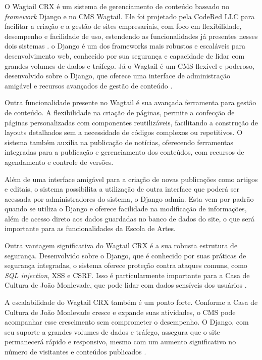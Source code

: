 O Wagtail CRX é um sistema de gerenciamento de conteúdo baseado no \textit{framework} Django e no \ac{CMS} Wagtail. Ele foi projetado pela CodeRed LLC para facilitar a criação e a gestão de sites empresariais, com foco em flexibilidade, desempenho e facilidade de uso, estendendo as funcionalidades já presentes nesses dois sistemas \cite{WagtailCRX}. o Django é um dos frameworks mais robustos e escaláveis para desenvolvimento web, conhecido por sua segurança e capacidade de lidar com grandes volumes de dados e tráfego. Já o Wagtail é um \ac{CMS} flexível e poderoso, desenvolvido sobre o Django, que oferece uma interface de administração amigável e recursos avançados de gestão de conteúdo \cite{Wagtail}.

Outra funcionalidade presente no Wagtail é sua avançada ferramenta para gestão de conteúdo. A flexibilidade na criação de páginas, permite a confecção de páginas personalizadas com componentes reutilizáveis, facilitando a construção de layouts detalhados sem a necessidade de códigos complexos ou repetitivos. O sistema também auxilia na publicação de notícias, oferecendo ferramentas integradas para a publicação e gerenciamento dos conteúdos, com recursos de agendamento e controle de versões.

Além de uma interface amigável para a criação de novas publicações como artigos e editais, o sistema possibilita a utilização de outra interface que poderá ser acessada por administradores do sistema, o Django admin. Esta vem por padrão quando se utiliza o Django e oferece facilidade na modificação de informações, além de acesso direto aos dados guardadas no banco de dados do site, o que será importante para as funcionalidades da Escola de Artes.

Outra vantagem significativa do Wagtail CRX é a sua robusta estrutura de segurança. Desenvolvido sobre o Django, que é conhecido por suas práticas de segurança integradas, o sistema oferece proteção contra ataques comuns, como \textit{SQL injection}, \ac{XSS} e \ac{CSRF}. Isso é particularmente importante para a Casa de Cultura de João Monlevade, que pode lidar com dados sensíveis dos usuários \cite{DjangoCSRF}.

A escalabilidade do Wagtail CRX também é um ponto forte. Conforme a Casa de Cultura de João Monlevade cresce e expande suas atividades, o \ac{CMS} pode acompanhar esse crescimento sem comprometer o desempenho. O Django, com seu suporte a grandes volumes de dados e tráfego, assegura que o site permanecerá rápido e responsivo, mesmo com um aumento significativo no número de visitantes e conteúdos publicados \cite{ghimire2020comparative}.

